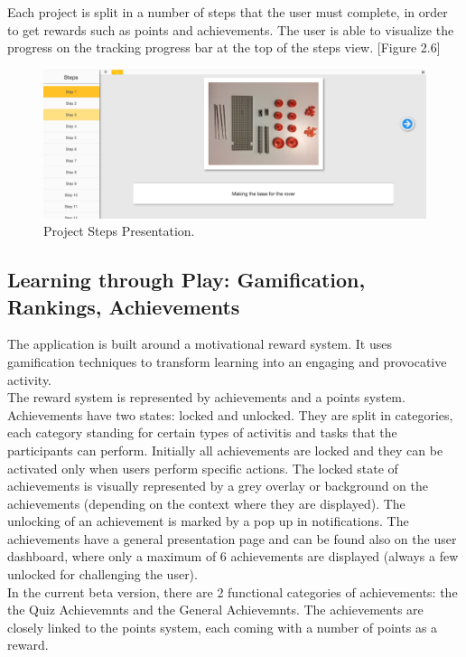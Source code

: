 Each project is split in a number of steps that the user must complete, in order to get rewards such as points and achievements. The user is able to visualize the progress on the tracking progress bar at the top of the steps view. [Figure 2.6] 

\begin{figure}
\includegraphics[width=1\linewidth]{images/ui/ProjectSteps.png}
\caption{Project Steps Presentation.}
\label{fig:project_steps}
\end{figure}


\subsection{Learning through Play: Gamification, Rankings, Achievements}

The application is built around a motivational reward system. It uses gamification techniques to transform learning into an engaging and provocative activity. \\

The reward system is represented by achievements and a points system. Achievements have two states: locked and unlocked. They are split in categories, each category standing for certain types of activitis and tasks that the participants can perform. Initially all achievements are locked and they can be activated only when users perform specific actions. The locked state of achievements is visually represented by a grey overlay or background on the achievements (depending on the context where they are displayed). The unlocking of an achievement is marked by a pop up in notifications. The achievements have a general presentation page and can be found also on the user dashboard, where only a maximum of 6 achievements are displayed (always a few unlocked for challenging the user).\\

In the current beta version, there are 2 functional categories of achievements: the the Quiz Achievemnts and the General Achievemnts. The achievements are closely linked to the points system, each coming with a number of points as a reward.\\

